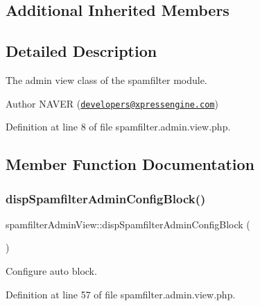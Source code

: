 \subsection*{Additional Inherited Members}


\subsection{Detailed Description}
The admin view class of the spamfilter module. 

\begin{DoxyAuthor}{Author}
N\+A\+V\+ER (\href{mailto:developers@xpressengine.com}{\tt developers@xpressengine.\+com}) 
\end{DoxyAuthor}


Definition at line 8 of file spamfilter.\+admin.\+view.\+php.



\subsection{Member Function Documentation}
\hypertarget{classspamfilterAdminView_a9619c9c4492158c50bb7d07d0bd4fb63}{}\label{classspamfilterAdminView_a9619c9c4492158c50bb7d07d0bd4fb63} 
\subsubsection{\texorpdfstring{disp\+Spamfilter\+Admin\+Config\+Block()}{dispSpamfilterAdminConfigBlock()}}
{\footnotesize\ttfamily spamfilter\+Admin\+View\+::disp\+Spamfilter\+Admin\+Config\+Block (\begin{DoxyParamCaption}{ }\end{DoxyParamCaption})}



Configure auto block. 



Definition at line 57 of file spamfilter.\+admin.\+view.\+php.

\hypertarget{classspamfilterAdminView_ab568df0fe3a41960908ad05538d16335}{}\label{classspamfilterAdminView_ab568df0fe3a41960908ad05538d16335} 
